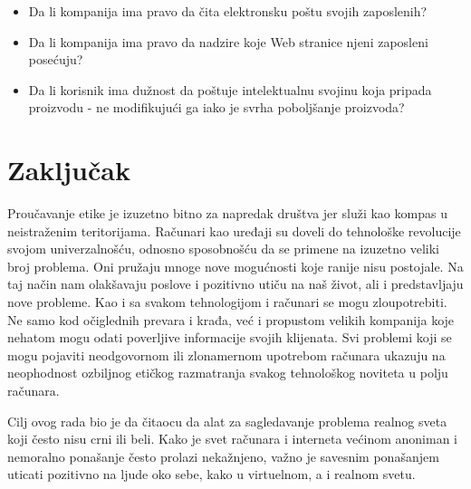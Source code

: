 \documentclass[a4paper]{article}
\begin{document}
\begin{itemize} 
\item Da li kompanija ima pravo da čita elektronsku poštu svojih zaposlenih?
\item Da li kompanija ima pravo da nadzire koje Web stranice njeni zaposleni posećuju?
\item Da li korisnik ima dužnost da poštuje intelektualnu svojinu koja pripada proizvodu - ne modifikujući ga iako je svrha poboljšanje proizvoda?
\end{itemize}

\section{Zaključak}
\label{sec:zakljucak}

Proučavanje etike je izuzetno bitno za napredak društva jer služi kao kompas u neistraženim teritorijama. Računari kao uređaji su doveli do tehnološke revolucije svojom univerzalnošću, odnosno sposobnošću da se primene na izuzetno veliki broj problema. Oni pružaju mnoge nove mogućnosti koje ranije nisu postojale. Na taj način nam olakšavaju poslove i pozitivno utiču na naš život, ali i predstavljaju nove probleme. Kao i sa svakom tehnologijom i računari se mogu zloupotrebiti. Ne samo kod očiglednih prevara i krađa, već i propustom velikih kompanija koje nehatom mogu odati poverljive informacije svojih klijenata. Svi problemi koji se mogu pojaviti neodgovornom ili zlonamernom upotrebom računara ukazuju na neophodnost ozbiljnog etičkog razmatranja svakog tehnološkog noviteta u polju računara.

Cilj ovog rada bio je da čitaocu da alat za sagledavanje problema realnog sveta koji često nisu crni ili beli. Kako je svet računara i interneta većinom anoniman i nemoralno ponašanje često prolazi nekažnjeno, važno je savesnim ponašanjem uticati pozitivno na ljude oko sebe, kako u virtuelnom, a i realnom svetu.



\appendix
 


\appendix
\end{document}
